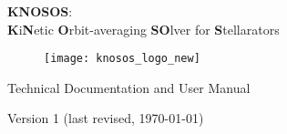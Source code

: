 \begin{center}

{\Huge \textbf{KNOSOS}:} \\
\vskip0.5cm
{\LARGE \textbf{K}i\textbf{N}etic \textbf{O}rbit-averaging \textbf{SO}lver for \textbf{S}tellarators}

\vskip0.5cm

\begin{figure}[h]
\begin{center}
\texttt{[image: knosos\_logo\_new]}
\end{center}
\end{figure}


{\Large Technical Documentation and User Manual}

\vspace{0.5in}


Version 1 (last revised, \today)

\end{center}


